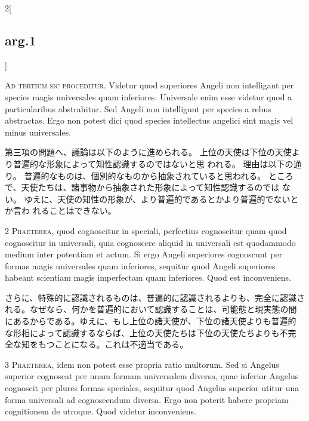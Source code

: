 \documentclass[paper=a4paper,fontsize=10pt,jafontsize=9pt,titlepage]{jlreq}
\begin{document}
\begin{paracol}{2}[\subsection{arg.1}]

{\huge A}{\scshape d tertium sic proceditur}. Videtur quod superiores
 Angeli non intelligant per species magis universales quam
 inferiores. Universale enim esse videtur quod a particularibus
 abstrahitur. Sed Angeli non intelligunt per species a rebus
 abstractas. Ergo non potest dici quod species intellectus angelici sint
 magis vel minus universales.

\switchcolumn

第三項の問題へ、議論は以下のように進められる。
上位の天使は下位の天使より普遍的な形象によって知性認識するのではないと思
 われる。
理由は以下の通り。
普遍的なものは、個別的なものから抽象されていると思われる。
ところで、天使たちは、諸事物から抽象された形象によって知性認識するのでは
 ない。
ゆえに、天使の知性の形象が、より普遍的であるとかより普遍的でないとか言わ
 れることはできない。


{\scshape 2 Praeterea}, quod cognoscitur in speciali,
perfectius cognoscitur quam quod cognoscitur in universali, quia
cognoscere aliquid in universali est quodammodo medium inter potentiam
et actum. Si ergo Angeli superiores cognoscunt per formas magis
universales quam inferiores, sequitur quod Angeli superiores habeant
scientiam magis imperfectam quam inferiores. Quod est inconveniens.

\switchcolumn

さらに、特殊的に認識されるものは、普遍的に認識されるよりも、完全に認識さ
 れる。なぜなら、何かを普遍的において認識することは、可能態と現実態の間
 にあるからである。ゆえに、もし上位の諸天使が、下位の諸天使よりも普遍的
 な形相によって認識するならば、上位の天使たちは下位の天使たちよりも不完
 全な知をもつことになる。これは不適当である。


{\scshape 3 Praeterea}, idem non potest esse propria
ratio multorum. Sed si Angelus superior cognoscat per unam formam
universalem diversa, quae inferior Angelus cognoscit per plures formas
speciales, sequitur quod Angelus superior utitur una forma universali ad
cognoscendum diversa. Ergo non poterit habere propriam cognitionem de
utroque. Quod videtur inconveniens.


\end{paracol}
\end{document}
